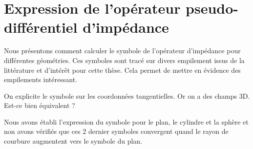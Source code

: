\chapter{Expression de l'opérateur pseudo-différentiel d'impédance}
\label{sec:chap1}
\minitoc
\newpage
{}
Nous présentons comment calculer le symbole de l'opérateur d'impédance pour différentes géométries. Ces symboles sont tracé sur divers empilement issus de la littérature et d’intérêt pour cette thèse. Cela permet de mettre en évidence des empilements intéressant.
\begin{TODO}
    On explicite le symbole sur les coordonnées tangentielles. Or on a des champs 3D. Est-ce bien équivalent ?
\end{TODO}




Nous avons établi l'expression du symbole pour le plan, le cylindre et la sphère et non avons vérifiés que ces 2 dernier symboles convergent quand le rayon de courbure augmentent vers le symbole du plan.